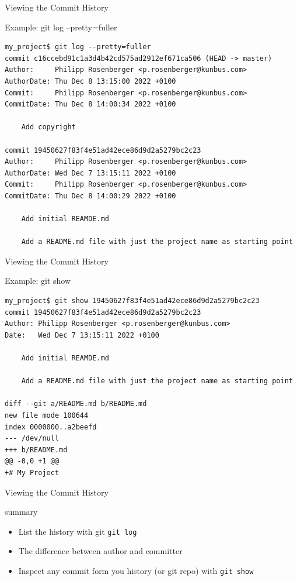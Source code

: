 \documentclass[aspectratio=169]{beamer}
\renewcommand{\footnotesize}{\tiny}
\newcommand{\sectiontitle}{}
\begin{document}
\begin{frame}[fragile]{Viewing the Commit History}{\sectiontitle}
\begin{block}{Example: \ttfamily git log --pretty=fuller}
\begin{verbatim}
my_project$ git log --pretty=fuller 
commit c16ccebd91c1a3d4b42cd575ad2912ef671ca506 (HEAD -> master)
Author:     Philipp Rosenberger <p.rosenberger@kunbus.com>
AuthorDate: Thu Dec 8 13:15:00 2022 +0100
Commit:     Philipp Rosenberger <p.rosenberger@kunbus.com>
CommitDate: Thu Dec 8 14:00:34 2022 +0100

    Add copyright

commit 19450627f83f4e51ad42ece86d9d2a5279bc2c23
Author:     Philipp Rosenberger <p.rosenberger@kunbus.com>
AuthorDate: Wed Dec 7 13:15:11 2022 +0100
Commit:     Philipp Rosenberger <p.rosenberger@kunbus.com>
CommitDate: Thu Dec 8 14:00:29 2022 +0100

    Add initial REAMDE.md
    
    Add a README.md file with just the project name as starting point
\end{verbatim}
\end{block}
\end{frame}

\begin{frame}[fragile]{Viewing the Commit History}{\sectiontitle}
\begin{block}{Example: \ttfamily git show}
\begin{verbatim}
my_project$ git show 19450627f83f4e51ad42ece86d9d2a5279bc2c23
commit 19450627f83f4e51ad42ece86d9d2a5279bc2c23
Author: Philipp Rosenberger <p.rosenberger@kunbus.com>
Date:   Wed Dec 7 13:15:11 2022 +0100

    Add initial REAMDE.md
    
    Add a README.md file with just the project name as starting point

diff --git a/README.md b/README.md
new file mode 100644
index 0000000..a2beefd
--- /dev/null
+++ b/README.md
@@ -0,0 +1 @@
+# My Project
\end{verbatim}
\end{block}
\end{frame}

\begin{frame}[fragile]{Viewing the Commit History}{\sectiontitle}
\begin{block}{summary}
\begin{itemize}
    \item List the history with git \verb|git log|
    \item The difference between author and committer 
    \item Inspect any commit form you history (or git repo) with \verb|git show|
\end{itemize}
\end{block}
\end{frame}
\end{document}
